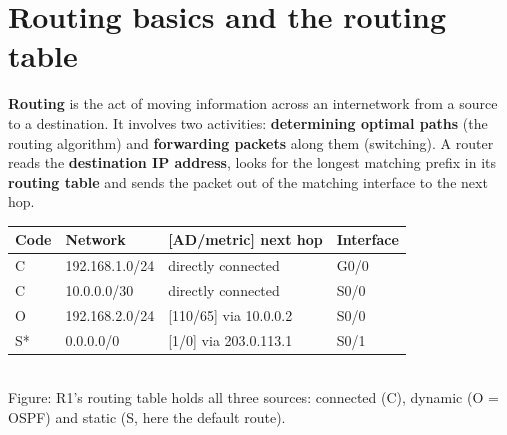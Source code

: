 \documentclass[10pt]{article}
\begin{document}
\section{Routing basics and the routing table}

\textbf{Routing} is the act of moving information across an internetwork from a source to a destination. It involves two activities: \textbf{determining optimal paths} (the routing algorithm) and \textbf{forwarding packets} along them (switching). A router reads the \textbf{destination IP address}, looks for the longest matching prefix in its \textbf{routing table} and sends the packet out of the matching interface to the next hop.

\begin{center}
\begin{minipage}{\linewidth}\centering
{}

\smallskip
\small
\begin{tabular}{llll}
\toprule
\textbf{Code} & \textbf{Network} & \textbf{[AD/metric] next hop} & \textbf{Interface}\\\midrule
C & 192.168.1.0/24 & directly connected & G0/0\\
C & 10.0.0.0/30 & directly connected & S0/0\\
O & 192.168.2.0/24 & [110/65] via 10.0.0.2 & S0/0\\
S* & 0.0.0.0/0 & [1/0] via 203.0.113.1 & S0/1\\
\bottomrule
\end{tabular}\\
{\scriptsize\color{midgrey}Figure: R1's routing table holds all three sources: connected (C), dynamic (O = OSPF) and static (S, here the default route).}
\end{minipage}
\end{center}
\end{document}
